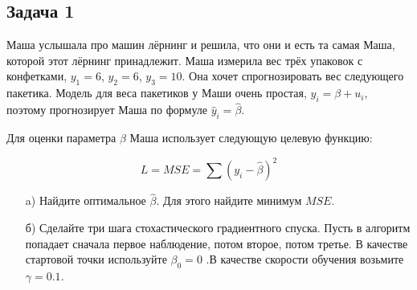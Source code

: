\documentclass[12pt, a4paper, oneside]{article}
\begin{document}
\subsection*{Задача 1}

Маша услышала про машин лёрнинг и решила, что они и есть та самая Маша, которой этот лёрнинг принадлежит.  Маша измерила вес трёх упаковок с конфетками,  $y_1=6$, $y_2=6$, $y_3=10$.  Она хочет спрогнозировать вес следующего пакетика. Модель для веса пакетиков у Маши очень простая,  $y_i = \beta + u_i, $ поэтому прогнозирует Маша по формуле $\hat y_i = \hat \beta$.

Для оценки параметра $\beta$ Маша использует следующую целевую функцию:

\[
L = MSE = \sum (y_i - \hat \beta)^2 
\]


\begin{enumerate}
	\item[a)] Найдите оптимальное $\hat \beta$. Для этого найдите минимум $MSE$. 
	\item[б)] Сделайте три шага стохастического градиентного спуска.  Пусть в алгоритм попадает сначала первое наблюдение, потом второе, потом третье. В качестве стартовой точки используйте $\beta_0= 0$ .В качестве скорости обучения возьмите $\gamma = 0.1.$
\end{enumerate}
\end{document}
